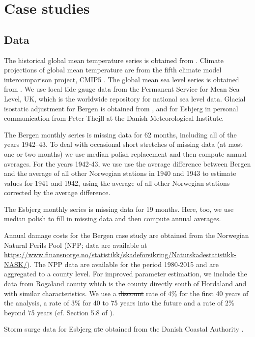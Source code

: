 \documentclass[draft,linenumbers]{agujournal}
\providecommand{\DIFadd}[1]{{\protect\color{blue}\uwave{#1}}} %
\providecommand{\DIFdel}[1]{{\protect\color{red}\sout{#1}}}                      %
\providecommand{\DIFaddbegin}{} %
\providecommand{\DIFaddend}{} %
\providecommand{\DIFdelbegin}{} %
\providecommand{\DIFdelend}{} %
\begin{document}
\DIFaddend \section{Case studies}
\label{cases}

\subsection{Data}
The historical global mean temperature series is obtained from \citet{giss}. Climate projections of global mean temperature are from the fifth climate model intercomparison project, CMIP5 \citep{cmip5}. The global mean sea level series is obtained from \citet{csiro}. We use local tide gauge data from the Permanent Service for Mean Sea Level, UK, which is the worldwide repository for national sea level data. Glacial isostatic adjustment for Bergen is obtained from \citet{Simpson2014}, and for Esbjerg in personal communication from Peter Thejll at the Danish Meteorological Institute. 

The Bergen monthly series is missing data for 62 months, including all of the years 1942--43. To deal with occasional short stretches of missing data (at most one or two months) we use median polish replacement \citep{medpol} and then compute annual averages. For the years 1942-43, we use use the average difference between Bergen and the average of all other Norwegian stations in 1940 and 1943 to estimate values for 1941 and 1942, using the average of all other Norwegian stations corrected by the average difference. 

The Esbjerg monthly series is missing data for 19 months. Here, too, we use median polish to fill in missing data and then compute annual averages.

Annual damage costs for the Bergen case study are obtained from the Norwegian Natural Perils Pool (NPP;  data are available at \url{https://www.finansnorge.no/statistikk/skadeforsikring/Naturskadestatistikk-NASK/}). The NPP data are available for the period 1980-2015 and are aggregated to a county level. For improved parameter estimation, we include the data from Rogaland county which is the county directly south of Hordaland and with similar characteristics. We use a \DIFdelbegin \DIFdel{discount }\DIFdelend \DIFaddbegin \DIFadd{dicsount }\DIFaddend rate of 4\% for the first 40 years of the analysis, a rate of 3\% for 40 to 75 years into the future and a rate of 2\% beyond 75 years (cf. Section 5.8 of \citet{DiscountRate}).  

Storm surge data for Esbjerg \DIFdelbegin \DIFdel{ate }\DIFdelend \DIFaddbegin \DIFadd{are }\DIFaddend obtained from the Danish Coastal Authority \citep{sealevel2012}.
\end{document}

